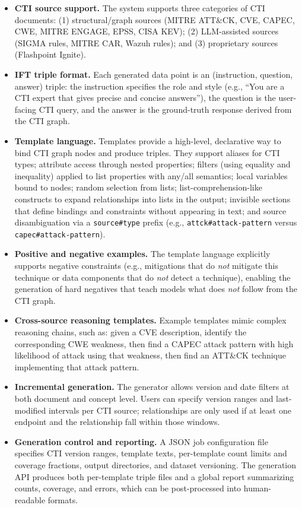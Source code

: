 \documentclass[10pt]{article}
\begin{document}
\begin{itemize}[leftmargin=*]
  \item \textbf{CTI source support.} The system supports three categories of CTI documents: (1) structural/graph sources (MITRE ATT\&CK, CVE, CAPEC, CWE, MITRE ENGAGE, EPSS, CISA KEV); (2) LLM-assisted sources (SIGMA rules, MITRE CAR, Wazuh rules); and (3) proprietary sources (Flashpoint Ignite).
  \item \textbf{IFT triple format.} Each generated data point is an (instruction, question, answer) triple: the instruction specifies the role and style (e.g., ``You are a CTI expert that gives precise and concise answers''), the question is the user-facing CTI query, and the answer is the ground-truth response derived from the CTI graph.
  \item \textbf{Template language.} Templates provide a high-level, declarative way to bind CTI graph nodes and produce triples. They support aliases for CTI types; attribute access through nested properties; filters (using equality and inequality) applied to list properties with any/all semantics; local variables bound to nodes; random selection from lists; list-comprehension-like constructs to expand relationships into lists in the output; invisible sections that define bindings and constraints without appearing in text; and source disambiguation via a \verb|source#type| prefix (e.g., \verb|attck#attack-pattern| versus \verb|capec#attack-pattern|).\cite{cardei2025ift}
  \item \textbf{Positive and negative examples.} The template language explicitly supports negative constraints (e.g., mitigations that do \emph{not} mitigate this technique or data components that do \emph{not} detect a technique), enabling the generation of hard negatives that teach models what does \emph{not} follow from the CTI graph.
  \item \textbf{Cross-source reasoning templates.} Example templates mimic complex reasoning chains, such as: given a CVE description, identify the corresponding CWE weakness, then find a CAPEC attack pattern with high likelihood of attack using that weakness, then find an ATT\&CK technique implementing that attack pattern.
  \item \textbf{Incremental generation.} The generator allows version and date filters at both document and concept level. Users can specify version ranges and last-modified intervals per CTI source; relationships are only used if at least one endpoint and the relationship fall within those windows.
  \item \textbf{Generation control and reporting.} A JSON job configuration file specifies CTI version ranges, template texts, per-template count limits and coverage fractions, output directories, and dataset versioning. The generation API produces both per-template triple files and a global report summarizing counts, coverage, and errors, which can be post-processed into human-readable formats.\cite{cardei2025ift}
\end{itemize}
\end{document}
